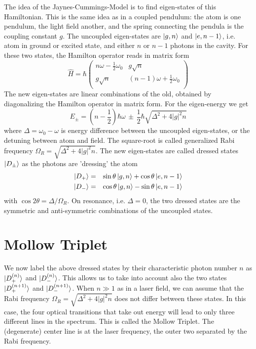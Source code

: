 The idea of the Jaynes-Cummings-Model is to find eigen-states of this Hamiltonian. This is the same idea as in a coupled pendulum: the atom is one pendulum, the light field another, and the spring connecting the pendula is the coupling constant $g$. The uncoupled eigen-states are $\ket{g, n}$ and  $\ket{e, n-1}$, i.e. atom in ground or excited state, and either $n$ or $n-1$ photons in the cavity. For these two states, the Hamilton operator reads in matrix form
\begin{equation}
\hat{H} = \hbar 
\begin{pmatrix}
n \omega - \frac{1}{2} \omega_0  & g \sqrt{n} \\
g \sqrt{n} & (n-1) \omega + \frac{1}{2} \omega_0 \\
\end{pmatrix}
\end{equation}
The new eigen-states are linear combinations of the old, obtained by diagonalizing the Hamilton operator in matrix form. For the eigen-energy we get
\begin{equation}
E_\pm = \left( n - \frac{1}{2} \right) \hbar \omega \, \pm \, \frac{1}{2} \hbar
\sqrt{\Delta^2 + 4 |g|^2 n}
\end{equation}
where $\Delta = \omega_0 - \omega$
is energy difference between the uncoupled eigen-states, or the detuning between atom and field. The square-root is called generalized Rabi frequency $\Omega_R = \sqrt{\Delta^2 + 4 |g|^2 n}$. The new eigen-states are called dressed states $\ket{D_\pm}$ as the photons are 'dressing' the atom
\begin{eqnarray}
\ket{D_+} &= &\sin \theta \ket{g,n} + \cos \theta \ket{e,n-1} \\
\ket{D_-} & = &\cos \theta \ket{g,n} - \sin \theta \ket{e,n-1} 
\end{eqnarray}
with $\cos 2\theta = \Delta / \Omega_R$. On resonance, i.e. $\Delta = 0$, the two dressed states are the symmetric and anti-symmetric combinations of the uncoupled states.

\section{Mollow Triplet}

We now label the above dressed states by their characteristic photon number $n$ as $\ket{D_+^{(n)}}$ and $\ket{D_-^{(n)}}$. This allows us to take into account also the two states $\ket{D_+^{(n+1)}}$ and $\ket{D_-^{(n+1)}}$. 
When $n \gg 1$ as in a laser field,  we can assume that the Rabi frequency $\Omega_R = \sqrt{\Delta^2 + 4 |g|^2 n}$ does not differ between these states. In this case, the four optical transitions that take out energy will lead to   only three different lines in the spectrum. This is called the Mollow Triplet. The (degenerate) center line is at the laser frequency, the outer two separated by the Rabi frequency.


